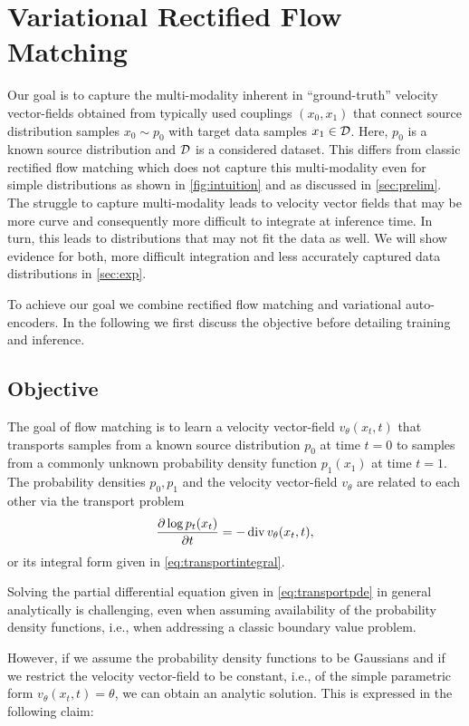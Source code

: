 \section{Variational Rectified Flow Matching}
\label{sec:method}
Our goal is to  capture the multi-modality inherent in ``ground-truth'' velocity vector-fields obtained from typically used couplings $(x_0,x_1)$ that connect source distribution samples $x_0\sim p_0$ with target data samples $x_1\in{\cal D}$. Here, $p_0$ is a known source distribution and ${\cal D}$ is a considered dataset. 
This differs from classic rectified flow matching which does not capture this multi-modality even for simple distributions as shown in \cref{fig:intuition} and as discussed in \cref{sec:prelim}.  
The struggle to capture multi-modality leads to velocity vector fields that may be more curve and consequently more difficult to integrate at inference time. 
In turn, this leads to distributions that may not fit the data as well. We will show evidence for both, more difficult integration and less accurately captured data distributions in \cref{sec:exp}. 

To achieve our goal we combine rectified flow matching and variational auto-encoders. In the following we first discuss the objective before detailing training and inference.

\subsection{Objective}
\label{sec:method:obj}

The goal of flow matching is to learn a velocity vector-field $v_\theta(x_t,t)$ that transports samples from a known source distribution $p_0$ at time $t=0$ to samples from a commonly unknown probability density function $p_1(x_1)$ at time $t=1$. The probability densities $p_0, p_1$ and the velocity vector-field $v_\theta$ are related to each other via the transport problem
\begin{equation}
\frac{\partial \log p_t(x_t)}{\partial t} = - \operatorname{div} v_\theta(x_t,t),
\label{eq:transportpde}
\end{equation}
or its integral form given in \cref{eq:transportintegral}.

Solving the partial differential equation given in \cref{eq:transportpde} in general analytically is challenging, even when assuming availability of the probability density functions, i.e., when addressing a classic boundary value problem.

However, if we assume the probability density functions to be Gaussians and if we restrict the velocity vector-field to be constant, i.e., of the simple parametric form $v_\theta(x_t,t) = \theta$, we can obtain an analytic solution. This is expressed in the following claim:

